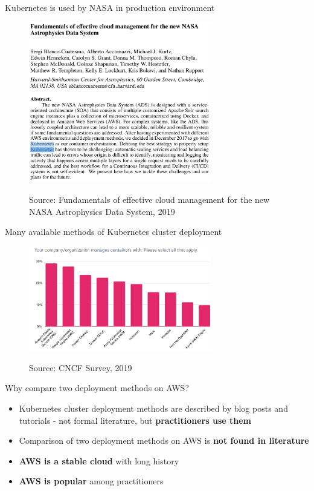 \documentclass{beamer}
\newcommand{\source}[1]{\caption*{Source: {#1}} }
\begin{document}
\begin{frame}{Kubernetes is used by NASA in production environment}%
	\begin{figure}
		\includegraphics[width=8cm]{figures/k8s-used-by-nasa.png}
		\label{fig:k8s-used-by-nasa}
		\source{Fundamentals of effective cloud management for the new NASA Astrophysics Data System, 2019}
	\end{figure}
\end{frame}

\begin{frame}{Many available methods of Kubernetes cluster deployment}%
\begin{figure}
\includegraphics[width=8cm]{figures/cncf-k8s-deployment-methods.png}
\label{fig:cncf-k8s-deployment-methods}
\source{CNCF Survey, 2019}
\end{figure}
\end{frame}

\begin{frame}{Why compare two deployment methods on AWS?}%
	\begin{itemize}
		\item Kubernetes cluster deployment methods are described by blog posts and tutorials - not formal literature, but \textbf{practitioners use them}
		\item Comparison of two deployment methods on AWS is \textbf{not found in literature}
		\item \textbf{AWS is a stable cloud} with long history
		\item \textbf{AWS is popular} among practitioners
	\end{itemize}
\end{frame}
\end{document}
